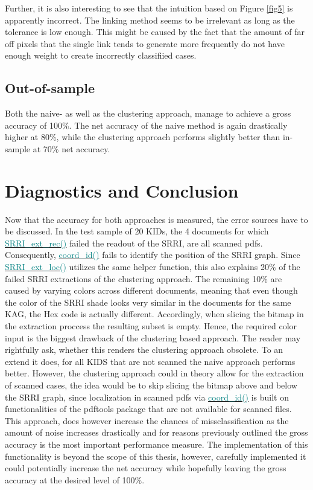 \documentclass[aodsor,preprint]{imsart}
\numberwithin{equation}{section}
\theoremstyle{plain}
\begin{document}
Further, it is also interesting to see that the intuition based on Figure \ref{fig5} is apparently incorrect. The linking method seems to be irrelevant as long as the tolerance is low enough. This might be caused by the fact that the amount of far off pixels that the single link tends to generate more frequently do not have enough weight to create incorrectly classifiied cases.

\subsection{Out-of-sample}
Both the naive- as well as the clustering approach, manage to achieve a gross accuracy of 100\%. The net accuracy of the naive method is again drastically higher at 80\%, while the clustering approach performs slightly better than in-sample at 70\% net accuracy.

\section{Diagnostics and Conclusion}
Now that the accuracy for both approaches is measured, the error sources have to be discussed. In the test sample of 20 KIDs, the 4 documents for which \href{https://github.com/Base-R-Best-R/KID/blob/main/Code/Package/KIDs/R/SRRI_ext_rec.R}{\textcolor{teal}{SRRI\_ext\_rec()}} failed the readout of the SRRI, are all scanned pdfs. Consequently, \href{https://github.com/Base-R-Best-R/KID/blob/main/Code/Package/KIDs/R/coord_id.R}{\textcolor{teal}{coord\_id()}} fails to identify the position of the SRRI graph. Since \href{https://github.com/Base-R-Best-R/KID/blob/main/Code/Package/KIDs/R/SRRI_ext_loc.R}{\textcolor{teal}{SRRI\_ext\_loc()}} utilizes the same helper function, this also explains 20\% of the failed SRRI extractions of the clustering approach. The remaining 10\% are caused by varying colors across different documents, meaning that even though the color of the SRRI shade looks very similar in the documents for the same KAG, the Hex code is actually different. Accordingly, when slicing the bitmap in the extraction proccess the resulting subset is empty. Hence, the required color input is the biggest drawback of the clustering based approach. The reader may rightfully ask, whether this renders the clustering approach obsolete. To an extend it does, for all KIDS that are not scanned the naive approach performs better. However, the clustering approach could in theory allow for the extraction of scanned cases, the idea would be to skip slicing the bitmap above and below the SRRI graph, since localization in scanned pdfs via \href{https://github.com/Base-R-Best-R/KID/blob/main/Code/Package/KIDs/R/coord_id.R}{\textcolor{teal}{coord\_id()}} is built on functionalities of the pdftools package that are not available for scanned files. This approach, does however increase the chances of missclassification as the amount of noise increases drastically and for reasons previously outlined the gross accuracy is the most important performance measure. The implementation of this functionality is beyond the scope of this thesis, however, carefully implemented it could potentially increase the net accuracy while hopefully leaving the gross accuracy at the desired level of 100\%.
\end{document}
